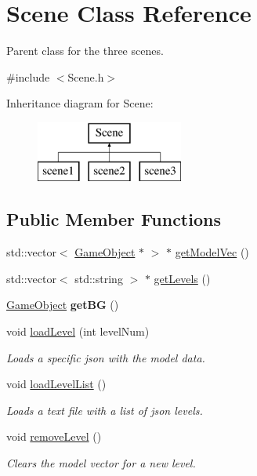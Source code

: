 \hypertarget{class_scene}{}\section{Scene Class Reference}
\label{class_scene}


Parent class for the three scenes.  




{\ttfamily \#include $<$Scene.\+h$>$}

Inheritance diagram for Scene\+:\begin{figure}[H]
\begin{center}
\leavevmode
\includegraphics[height=2.000000cm]{class_scene}
\end{center}
\end{figure}
\subsection*{Public Member Functions}
\begin{DoxyCompactItemize}
\item 
std\+::vector$<$ \mbox{\hyperlink{class_game_object}{Game\+Object}} $\ast$ $>$ $\ast$ \mbox{\hyperlink{class_scene_a7e4992f542e3c09a0b876e1efd912d78}{get\+Model\+Vec}} ()
\item 
std\+::vector$<$ std\+::string $>$ $\ast$ \mbox{\hyperlink{class_scene_a81ed92e210490ef87f67d793771d267e}{get\+Levels}} ()
\item 
\mbox{\label{class_scene_a2e0584a26d94c3db68e33edeef5832ef}} 
\mbox{\hyperlink{class_game_object}{Game\+Object}} {\bfseries get\+BG} ()
\item 
void \mbox{\hyperlink{class_scene_a1420e05a757cd71a347c9399860b8e74}{load\+Level}} (int level\+Num)
\begin{DoxyCompactList}\small\item\em Loads a specific json with the model data. \end{DoxyCompactList}\item 
void \mbox{\hyperlink{class_scene_a6c6f1a202dcabaa123ec191c206d9e33}{load\+Level\+List}} ()
\begin{DoxyCompactList}\small\item\em Loads a text file with a list of json levels. \end{DoxyCompactList}\item 
\mbox{\label{class_scene_a6d75291997e8288770b4354f26055d01}} 
void \mbox{\hyperlink{class_scene_a6d75291997e8288770b4354f26055d01}{remove\+Level}} ()
\begin{DoxyCompactList}\small\item\em Clears the model vector for a new level. \end{DoxyCompactList}\end{DoxyCompactItemize}


